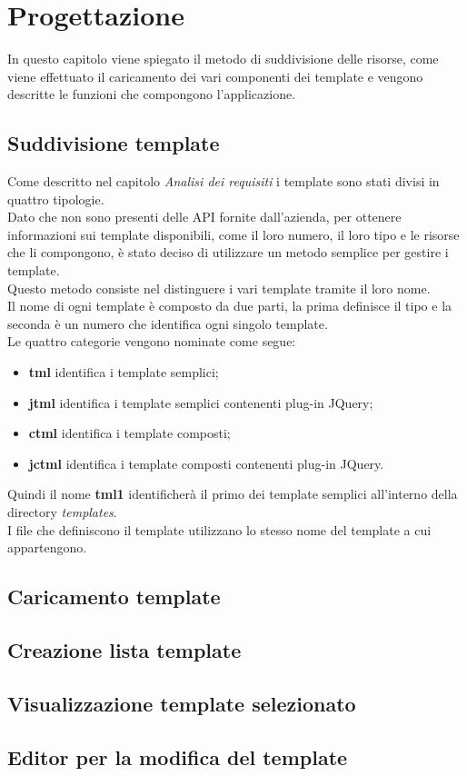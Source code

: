 
\chapter{Progettazione}
\label{cap:progettazione}
In questo capitolo viene spiegato il metodo di suddivisione delle risorse, come viene effettuato il caricamento dei vari componenti dei template e vengono descritte le funzioni che compongono l'applicazione.
\section{Suddivisione template}
Come descritto nel capitolo \textit{Analisi dei requisiti} i template sono stati divisi in quattro tipologie.\\
Dato che non sono presenti delle API fornite dall'azienda, per ottenere informazioni sui template disponibili, come il loro numero, il loro tipo e le risorse che li compongono, è stato deciso di utilizzare un metodo semplice per gestire i template.\\
Questo metodo consiste nel distinguere i vari template tramite il loro nome.\\
Il nome di ogni template è composto da due parti, la prima definisce il tipo e la seconda è un numero che identifica ogni singolo template.\\
Le quattro categorie vengono nominate come segue:
\begin{itemize}
	\item \textbf{tml} identifica i template semplici;
	\item \textbf{jtml} identifica i template semplici contenenti plug-in JQuery;
	\item \textbf{ctml} identifica i template composti;
	\item \textbf{jctml} identifica i template composti contenenti plug-in JQuery.
\end{itemize}
Quindi il nome \textbf{tml1} identificherà il primo dei template semplici all'interno della directory \textit{templates}.\\
I file che definiscono il template utilizzano lo stesso nome del template a cui appartengono.

\section{Caricamento template}
\section{Creazione lista template}
\section{Visualizzazione template selezionato}
\section{Editor per la modifica del template}